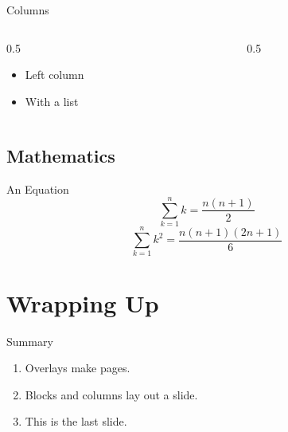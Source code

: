 \documentclass[aspectratio=169]{beamer}
\begin{document}
\begin{frame}{Columns}
  \begin{columns}
    \begin{column}{0.5\textwidth}
      \begin{itemize}
        \item Left column
        \item With a list
      \end{itemize}
    \end{column}
    \begin{column}{0.5\textwidth}
      \centering
    \end{column}
  \end{columns}
\end{frame}

\subsection{Mathematics}
\begin{frame}{An Equation}
  \[
    \sum_{k=1}^{n} k = \frac{n(n+1)}{2}
  \]
  \pause
  \[
    \sum_{k=1}^{n} k^2 = \frac{n(n+1)(2n+1)}{6}
  \]
\end{frame}

\section{Wrapping Up}

\begin{frame}{Summary}
  \begin{enumerate}
    \item Overlays make pages.
    \item Blocks and columns lay out a slide.
    \item This is the last slide.
  \end{enumerate}
\end{frame}
\end{document}
